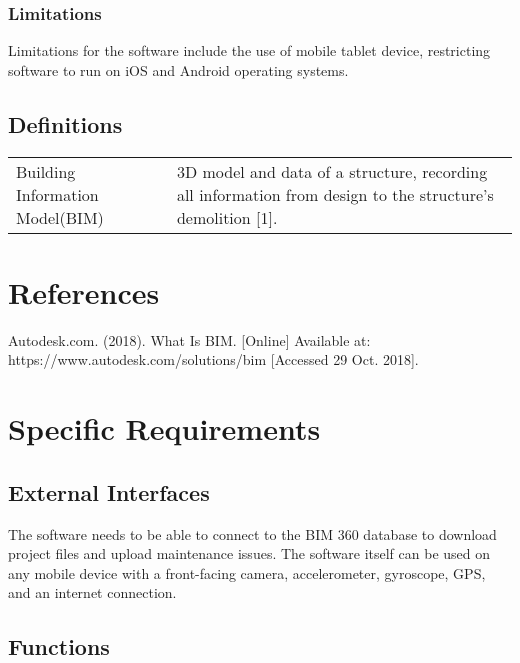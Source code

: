 \documentclass[onecolumn, draftclsnofoot,10pt, compsoc]{IEEEtran}
\begin{document}
            
            \subsubsection{Limitations}
            \hangindent=10mm\noindent Limitations for the software include the use of mobile tablet device, restricting software to run on iOS and Android operating systems.\par
    \subsection{Definitions}
            \begin{table}[ht]
                \hspace{10mm}
                \begin{tabular}{l p{100mm}}
                   Building Information Model(BIM) & 3D model and data of a structure, recording all information from design to the structure's demolition [1].
                \end{tabular}
            \end{table}

\section{References}
    \hangindent=10mm\noindent [1] Autodesk.com. (2018). What Is BIM. [Online] Available at: https://www.autodesk.com/solutions/bim [Accessed 29 Oct. 2018]. \par

\section{Specific Requirements}
    \subsection{External Interfaces}
        \hangindent=10mm\noindent The software needs to be able to connect to the BIM 360 database to download project files and upload maintenance issues. The software itself can be used on any mobile device with a front-facing camera, accelerometer, gyroscope, GPS, and an internet connection. \par
    \subsection{Functions} %
\end{document}
